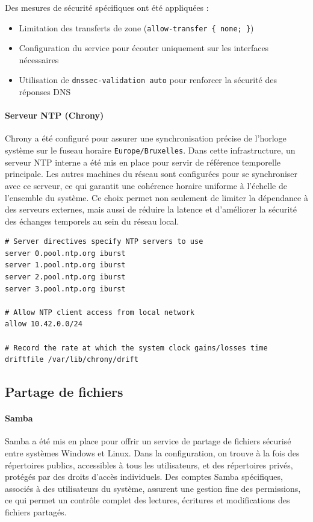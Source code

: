 \documentclass[a4paper,12pt]{article}
\begin{document}
Des mesures de sécurité spécifiques ont été appliquées :
\begin{itemize}
    \item Limitation des transferts de zone (\texttt{allow-transfer \{ none; \}})
    \item Configuration du service pour écouter uniquement sur les interfaces nécessaires
    \item Utilisation de \texttt{dnssec-validation auto} pour renforcer la sécurité des réponses DNS
\end{itemize}

\paragraph{Serveur NTP (Chrony)}

Chrony a été configuré pour assurer une synchronisation précise de l'horloge système sur le fuseau horaire \texttt{Europe/Bruxelles}. Dans cette infrastructure, un serveur NTP interne a été mis en place pour servir de référence temporelle principale. Les autres machines du réseau sont configurées pour se synchroniser avec ce serveur, ce qui garantit une cohérence horaire uniforme à l'échelle de l'ensemble du système. Ce choix permet non seulement de limiter la dépendance à des serveurs externes, mais aussi de réduire la latence et d'améliorer la sécurité des échanges temporels au sein du réseau local.

\begin{lstlisting}[caption={Configuration NTP Chrony – /etc/chrony.conf}]
# Server directives specify NTP servers to use
server 0.pool.ntp.org iburst
server 1.pool.ntp.org iburst
server 2.pool.ntp.org iburst
server 3.pool.ntp.org iburst

# Allow NTP client access from local network
allow 10.42.0.0/24

# Record the rate at which the system clock gains/losses time
driftfile /var/lib/chrony/drift
\end{lstlisting}

\subsection{Partage de fichiers}

\paragraph{Samba}

Samba a été mis en place pour offrir un service de partage de fichiers sécurisé entre systèmes Windows et Linux. Dans la configuration, on trouve à la fois des répertoires publics, accessibles à tous les utilisateurs, et des répertoires privés, protégés par des droits d'accès individuels. Des comptes Samba spécifiques, associés à des utilisateurs du système, assurent une gestion fine des permissions, ce qui permet un contrôle complet des lectures, écritures et modifications des fichiers partagés.
\end{document}
